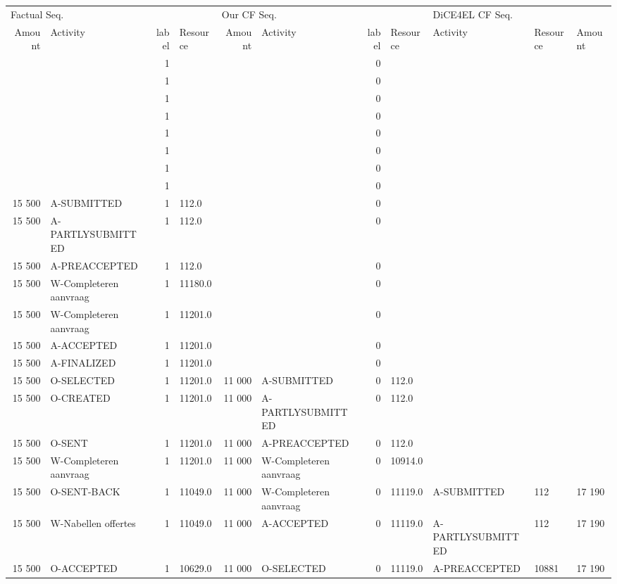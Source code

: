 \begin{tabular}{rlrlrlrllll}
\toprule
\multicolumn{4}{l}{Factual Seq.} & \multicolumn{4}{l}{Our CF Seq.} & \multicolumn{3}{l}{DiCE4EL CF Seq.} \\
Amount & Activity & label & Resource & Amount & Activity & label & Resource & Activity & Resource & Amount \\
\midrule
 &  & 1 &  &  &  & 0 &  &  &  &  \\
 &  & 1 &  &  &  & 0 &  &  &  &  \\
 &  & 1 &  &  &  & 0 &  &  &  &  \\
 &  & 1 &  &  &  & 0 &  &  &  &  \\
 &  & 1 &  &  &  & 0 &  &  &  &  \\
 &  & 1 &  &  &  & 0 &  &  &  &  \\
 &  & 1 &  &  &  & 0 &  &  &  &  \\
 &  & 1 &  &  &  & 0 &  &  &  &  \\
15 500 & A-SUBMITTED & 1 & 112.0 &  &  & 0 &  &  &  &  \\
15 500 & A-PARTLYSUBMITTED & 1 & 112.0 &  &  & 0 &  &  &  &  \\
15 500 & A-PREACCEPTED & 1 & 112.0 &  &  & 0 &  &  &  &  \\
15 500 & W-Completeren aanvraag & 1 & 11180.0 &  &  & 0 &  &  &  &  \\
15 500 & W-Completeren aanvraag & 1 & 11201.0 &  &  & 0 &  &  &  &  \\
15 500 & A-ACCEPTED & 1 & 11201.0 &  &  & 0 &  &  &  &  \\
15 500 & A-FINALIZED & 1 & 11201.0 &  &  & 0 &  &  &  &  \\
15 500 & O-SELECTED & 1 & 11201.0 & 11 000 & A-SUBMITTED & 0 & 112.0 &  &  &  \\
15 500 & O-CREATED & 1 & 11201.0 & 11 000 & A-PARTLYSUBMITTED & 0 & 112.0 &  &  &  \\
15 500 & O-SENT & 1 & 11201.0 & 11 000 & A-PREACCEPTED & 0 & 112.0 &  &  &  \\
15 500 & W-Completeren aanvraag & 1 & 11201.0 & 11 000 & W-Completeren aanvraag & 0 & 10914.0 &  &  &  \\
15 500 & O-SENT-BACK & 1 & 11049.0 & 11 000 & W-Completeren aanvraag & 0 & 11119.0 & A-SUBMITTED & 112 & 17 190 \\
15 500 & W-Nabellen offertes & 1 & 11049.0 & 11 000 & A-ACCEPTED & 0 & 11119.0 & A-PARTLYSUBMITTED & 112 & 17 190 \\
15 500 & O-ACCEPTED & 1 & 10629.0 & 11 000 & O-SELECTED & 0 & 11119.0 & A-PREACCEPTED & 10881 & 17 190 \\

\end{tabular}
